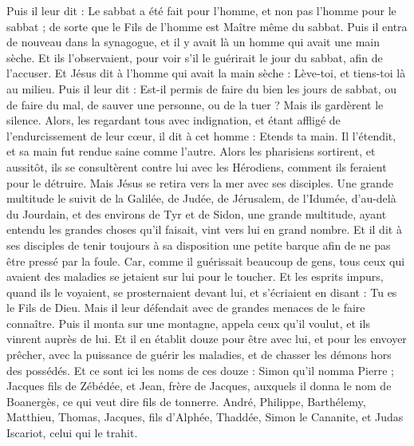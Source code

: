 \begin{multicols}{2}
Puis il leur dit : Le sabbat a été fait pour l'homme, et non pas l'homme pour le sabbat ;
de sorte que le Fils de l'homme est Maître même du sabbat.
\VerseOne{}Puis il entra de nouveau dans la synagogue, et il y avait là un homme qui avait une main sèche.
Et ils l'observaient, pour voir s'il le guérirait le jour du sabbat, afin de l'accuser.
Et Jésus dit à l'homme qui avait la main sèche : Lève-toi, et tiens-toi là au milieu.
Puis il leur dit : Est-il permis de faire du bien les jours de sabbat, ou de faire du mal, de sauver une personne, ou de la tuer ? Mais ils gardèrent le silence.
Alors, les regardant tous avec indignation, et étant affligé de l'endurcissement de leur cœur, il dit à cet homme : Etends ta main. Il l'étendit, et sa main fut rendue saine comme l'autre.
Alors les pharisiens sortirent, et aussitôt, ils se consultèrent contre lui avec les Hérodiens, comment ils feraient pour le détruire.
Mais Jésus se retira vers la mer avec ses disciples. Une grande multitude le suivit de la Galilée,
de Judée, de Jérusalem, de l'Idumée, d'au-delà du Jourdain, et des environs de Tyr et de Sidon, une grande multitude, ayant entendu les grandes choses qu'il faisait, vint vers lui en grand nombre.
Et il dit à ses disciples de tenir toujours à sa disposition une petite barque afin de ne pas être pressé par la foule.
Car, comme il guérissait beaucoup de gens, tous ceux qui avaient des maladies se jetaient sur lui pour le toucher.
Et les esprits impurs, quand ils le voyaient, se prosternaient devant lui, et s'écriaient en disant : Tu es le Fils de Dieu.
Mais il leur défendait avec de grandes menaces de le faire connaître.
Puis il monta sur une montagne, appela ceux qu'il voulut, et ils vinrent auprès de lui.
Et il en établit douze pour être avec lui,
et pour les envoyer prêcher, avec la puissance de guérir les maladies, et de chasser les démons hors des possédés.
Et ce sont ici les noms de ces douze : Simon qu'il nomma Pierre ;
Jacques fils de Zébédée, et Jean, frère de Jacques, auxquels il donna le nom de Boanergès, ce qui veut dire fils de tonnerre.
André, Philippe, Barthélemy, Matthieu, Thomas, Jacques, fils d'Alphée, Thaddée, Simon le Cananite,
et Judas Iscariot, celui qui le trahit.

\end{multicols}
